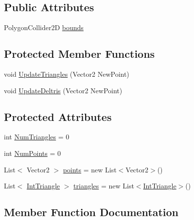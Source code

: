 \subsection*{Public Attributes}
\begin{DoxyCompactItemize}
\item 
Polygon\+Collider2D \mbox{\hyperlink{class_delaunay_triangulation_aeb242e46a6c940c61502ea5e08d4b5b6}{bounds}}
\end{DoxyCompactItemize}
\subsection*{Protected Member Functions}
\begin{DoxyCompactItemize}
\item 
void \mbox{\hyperlink{class_delaunay_triangulation_aa4ae5153592df4ba083d810a6d809999}{Update\+Triangles}} (Vector2 New\+Point)
\item 
void \mbox{\hyperlink{class_delaunay_triangulation_aa4b708614e1c66fde876d036630804da}{Update\+Deltris}} (Vector2 New\+Point)
\end{DoxyCompactItemize}
\subsection*{Protected Attributes}
\begin{DoxyCompactItemize}
\item 
int \mbox{\hyperlink{class_delaunay_triangulation_a04fce817ac5bdbc5ac2891e0efc8626b}{Num\+Triangles}} = 0
\item 
int \mbox{\hyperlink{class_delaunay_triangulation_aecaad9bab22a717e9ec4e91191896d83}{Num\+Points}} = 0
\item 
List$<$ Vector2 $>$ \mbox{\hyperlink{class_delaunay_triangulation_abe36cb50d65f6fa86fa15dba1cb413a5}{points}} = new List$<$Vector2$>$()
\item 
List$<$ \mbox{\hyperlink{struct_int_triangle}{Int\+Triangle}} $>$ \mbox{\hyperlink{class_delaunay_triangulation_a51e3e7d9301274730cba64afc6ce69cb}{triangles}} = new List$<$\mbox{\hyperlink{struct_int_triangle}{Int\+Triangle}}$>$()
\end{DoxyCompactItemize}


\subsection{Member Function Documentation}
\mbox{\label{class_delaunay_triangulation_a2880d1fc8f58a1c500da8276e31fbddc}} 
